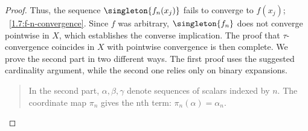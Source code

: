 \begin{proof}
%
Thus, the sequence $\singleton{f_n(x_j)}$ fails to converge to $f(x_j)$; %
\cf~\eqref{1.7:f-n-convergence}. Since $f$ was arbitrary, $\singleton{f_n}$ does not converge pointwise in $X$, which %
establishes the converse implication. The proof that $\tau$-convergence coincides in $X$ with pointwise convergence is then %
complete. We prove the second part in two different ways. The first proof uses the suggested cardinality argument, while the %
second one relies only on binary expansions.
% 
%
\begin{quote}\itshape
  \begin{exerciseStatement}
    In the second part, $\alpha, \beta, \gamma$ denote sequences of scalars indexed by $n$. The coordinate map $\pi_n$ gives %
    the $\mathrm{n}$th term: $\pi_n(\alpha) = \alpha_n$. 
  \end{exerciseStatement}
\end{quote}
%

\end{proof}
